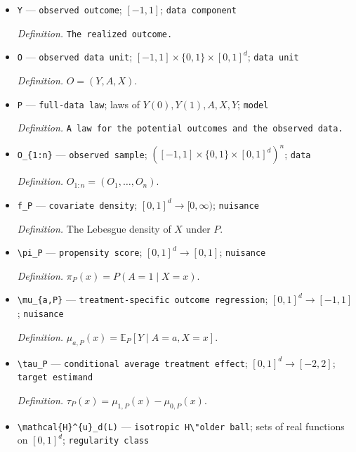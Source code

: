 \documentclass{article}
\begin{document}
\begin{itemize}
  \par\smallskip\noindent\emph{Definition.} \texttt{The observed pre-\allowbreak{}treatment covariate vector.}
  \item \texttt{Y} --- \texttt{observed outcome}; \([-1,1]\); \texttt{data component}
  \par\smallskip\noindent\emph{Definition.} \texttt{The realized outcome.}
  \item \texttt{O} --- \texttt{observed data unit}; \([-1,1]\times\{0,1\}\times[0,1]^d\); \texttt{data unit}
  \par\smallskip\noindent\emph{Definition.} \(O=(Y,A,X)\).
  \item \texttt{P} --- \texttt{full-\allowbreak{}data law}; laws of \(Y(0),Y(1),A,X,Y\); \texttt{model}
  \par\smallskip\noindent\emph{Definition.} \texttt{A law for the potential outcomes and the observed data.}
  \item \texttt{O\_\allowbreak{}\{1:\allowbreak{}n\}\allowbreak{}} --- \texttt{observed sample}; \(([-1,1]\times\{0,1\}\times[0,1]^d)^n\); \texttt{data}
  \par\smallskip\noindent\emph{Definition.} \(O_{1:n}=(O_1,\ldots,O_n)\).
  \item \texttt{f\_\allowbreak{}P} --- \texttt{covariate density}; \([0,1]^d\to[0,\infty)\); \texttt{nuisance}
  \par\smallskip\noindent\emph{Definition.} The Lebesgue density of \(X\) under \(P\).
  \item \texttt{\textbackslash{}\allowbreak{}pi\_\allowbreak{}P} --- \texttt{propensity score}; \([0,1]^d\to[0,1]\); \texttt{nuisance}
  \par\smallskip\noindent\emph{Definition.} \(\pi_P(x)=P(A=1\mid X=x)\).
  \item \texttt{\textbackslash{}\allowbreak{}mu\_\allowbreak{}\{a,\allowbreak{}P\}\allowbreak{}} --- \texttt{treatment-\allowbreak{}specific outcome regression}; \([0,1]^d\to[-1,1]\); \texttt{nuisance}
  \par\smallskip\noindent\emph{Definition.} \(\mu_{a,P}(x)=\mathbb{E}_P[Y\mid A=a,X=x]\).
  \item \texttt{\textbackslash{}\allowbreak{}tau\_\allowbreak{}P} --- \texttt{conditional average treatment effect}; \([0,1]^d\to[-2,2]\); \texttt{target estimand}
  \par\smallskip\noindent\emph{Definition.} \(\tau_P(x)=\mu_{1,P}(x)-\mu_{0,P}(x)\).
  \item \texttt{\textbackslash{}\allowbreak{}mathcal\{H\}\allowbreak{}\textasciicircum{}\{u\}\allowbreak{}\_\allowbreak{}d(L)} --- \texttt{isotropic H\textbackslash{}\allowbreak{}"older ball}; sets of real functions on \([0,1]^d\); \texttt{regularity class}

\end{itemize}
\end{document}
